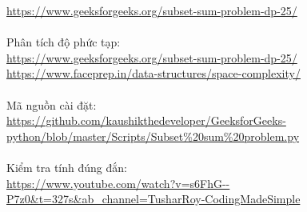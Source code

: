 \documentclass{article}
\begin{document}
\begin{itemize}
	    \url{https://www.geeksforgeeks.org/subset-sum-problem-dp-25/}\\\\
    	Phân tích độ phức tạp:\\ 
    	\url{https://www.geeksforgeeks.org/subset-sum-problem-dp-25/}\\
        \url{https://www.faceprep.in/data-structures/space-complexity/}\\\\
        Mã nguồn cài đặt:\\ 
        \url{https://github.com/kaushikthedeveloper/GeeksforGeeks-python/blob/master/Scripts/Subset%20sum%20problem.py}\\\\
        Kiểm tra tính đúng đắn: \\
      \url{https://www.youtube.com/watch?v=s6FhG--P7z0&t=327s&ab_channel=TusharRoy-CodingMadeSimple}
      
    \end{itemize}
\end{document}
